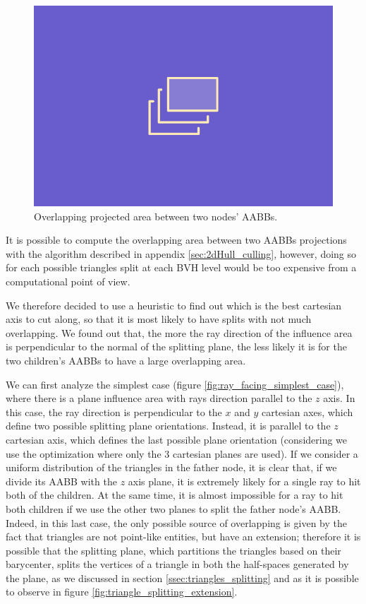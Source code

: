 \documentclass{PoliMi_MasterThesis}
\begin{document}
\begin{figure}[H]
    \centering
    \includegraphics[width=\textwidth*\real{0.6}]{Images/TODO.png}
    \caption{Overlapping projected area between two nodes' AABBs.}
    \label{fig:overlapping_projected_area}
\end{figure}

It is possible to compute the overlapping area between two AABBs projections with the algorithm described in appendix \ref{sec:2dHull_culling}, however, doing so for each possible triangles split at each BVH level would be too expensive from a computational point of view.

We therefore decided to use a heuristic to find out which is the best cartesian axis to cut along, so that it is most likely to have splits with not much overlapping. We found out that, the more the ray direction of the influence area is perpendicular to the normal of the splitting plane, the less likely it is for the two children's AABBs to have a large overlapping area.

We can first analyze the simplest case (figure \ref{fig:ray_facing_simplest_case}), where there is a plane influence area with rays direction parallel to the $z$ axis. In this case, the ray direction is perpendicular to the $x$ and $y$ cartesian axes, which define two possible splitting plane orientations. Instead, it is parallel to the $z$ cartesian axis, which defines the last possible plane orientation (considering we use the optimization where only the 3 cartesian planes are used). If we consider a uniform distribution of the triangles in the father node, it is clear that, if we divide its AABB with the $z$ axis plane, it is extremely likely for a single ray to hit both of the children. At the same time, it is almost impossible for a ray to hit both children if we use the other two planes to split the father node's AABB. Indeed, in this last case, the only possible source of overlapping is given by the fact that triangles are not point-like entities, but have an extension; therefore it is possible that the splitting plane, which partitions the triangles based on their barycenter, splits the vertices of a triangle in both the half-spaces generated by the plane, as we discussed in section \ref{ssec:triangles_splitting} and as it is possible to observe in figure \ref{fig:triangle_splitting_extension}.
\end{document}
